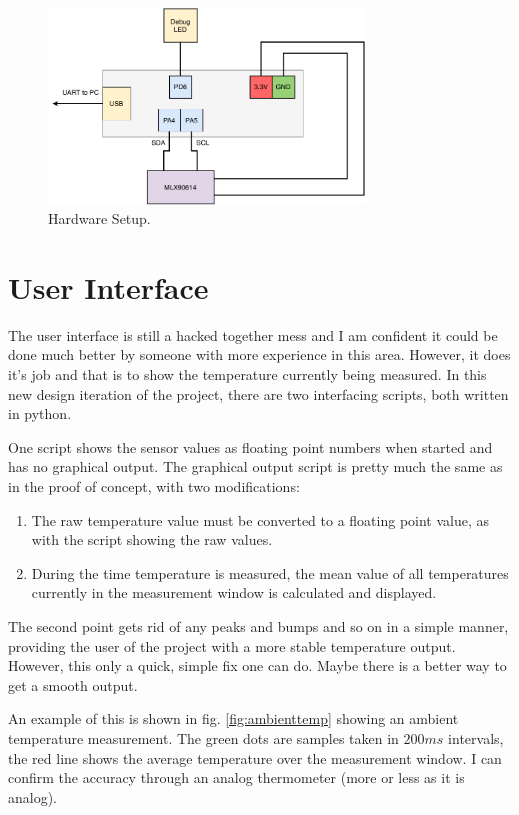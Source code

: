 \documentclass{article}[12pt]
\begin{document}
\begin{figure}[H]
  \caption{Hardware Setup.}
  \label{fig:hwsetup}
  \centering
    \includegraphics[width=0.75\textwidth]{img/hwsetup.pdf}
\end{figure}

\section{User Interface}

The user interface is still a hacked together mess and I am confident it could be done much better by someone with more experience in this area. However, it does it's job and that is to show the temperature currently being measured. In this new design iteration of the project, there are two interfacing scripts, both written in python. 

One script shows the sensor values as floating point numbers when started and has no graphical output. The graphical output script is pretty much the same as in the proof of concept, with two modifications: 

\begin{enumerate}
	\item The raw temperature value must be converted to a floating point value, as with the script showing the raw values.
	\item During the time temperature is measured, the mean value of all temperatures currently in the measurement window is calculated and displayed.
\end{enumerate}

The second point gets rid of any peaks and bumps and so on in a simple manner, providing the user of the project with a more stable temperature output. However, this only a quick, simple fix one can do. Maybe there is a better way to get a smooth output. 

An example of this is shown in fig. \ref{fig:ambienttemp} showing an ambient temperature measurement. The green dots are samples taken in $200ms$ intervals, the red line shows the average temperature over the measurement window. I can confirm the accuracy through an analog thermometer (more or less as it is analog).
\end{document}
